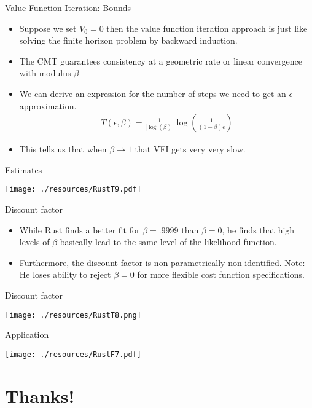 \documentclass[aspectratio=169,11pt]{beamer}
\begin{document}
\begin{frame}{Value Function Iteration: Bounds}
\begin{itemize}
\item Suppose we set $V_0 =0$ then the value function iteration approach is just like solving the finite horizon problem by backward induction.
\item The CMT guarantees consistency at a geometric rate or \alert{linear} convergence with modulus $\beta$
\item We can derive an expression for the number of steps we need to get an $\epsilon$-approximation.
\begin{eqnarray*}
T(\epsilon,\beta) = \frac{1}{| \log(\beta) | } \log \left (\frac{1}{(1-\beta)\epsilon} \right)
\end{eqnarray*}
\item This tells us that when $\beta \rightarrow 1$ that VFI gets very very slow.
\end{itemize}
\end{frame}



\begin{frame}{Estimates}
\begin{center}
\hspace*{-.5cm}\texttt{[image: ./resources/RustT9.pdf]}
\end{center}
\end{frame}

\begin{frame}{Discount factor}
\begin{itemize}
	\item While Rust finds a better fit for $\beta=.9999$ than $\beta=0$, he finds that high levels
	of $\beta$ basically lead to the same level of the likelihood function.

	\medskip
	\item Furthermore, the discount factor is non-parametrically non-identified. Note:
	He loses ability to reject $\beta=0$ for more flexible cost function specifications.

\end{itemize}
\end{frame}


\begin{frame}{Discount factor}
\begin{center}
\texttt{[image: ./resources/RustT8.png]}
\end{center}
\end{frame}

\begin{frame}{Application}
\begin{center}
\texttt{[image: ./resources/RustF7.pdf]}
\end{center}
\end{frame}


\section{Thanks!}
\end{document}
